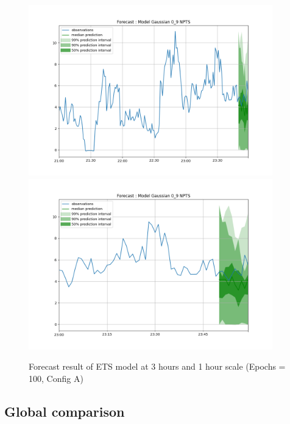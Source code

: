 \documentclass[a4paper, 12pt]{article}
\begin{document}
\begin{figure}[!h]
    \centering
    \includegraphics[width=400px]{plots/forecast/a/model/Gaussian/0_9/NPTS/180.png}
    \includegraphics[width=400px]{plots/forecast/a/model/Gaussian/0_9/NPTS/60.png}
    \caption{Forecast result of ETS model at 3 hours and 1 hour scale (Epochs = 100, Config A)}
    \label{fig:ets}
\end{figure}

\subsection{Global comparison}
\end{document}
